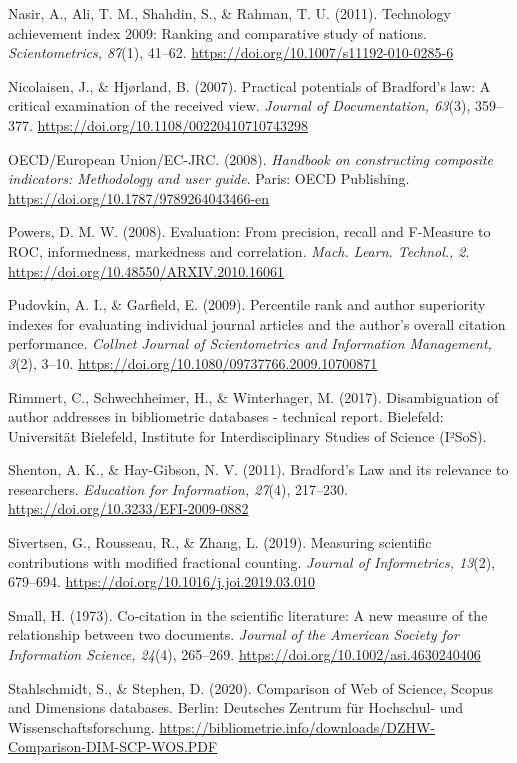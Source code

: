 \documentclass[
  letterpaper,
]{scrreprt}
\begin{document}
Nasir, A., Ali, T. M., Shahdin, S., \& Rahman, T. U. (2011). Technology
achievement index 2009: Ranking and comparative study of nations.
\emph{Scientometrics, 87}(1), 41--62.
\url{https://doi.org/10.1007/s11192-010-0285-6}

Nicolaisen, J., \& Hjørland, B. (2007). Practical potentials of
Bradford's law: A critical examination of the received view.
\emph{Journal of Documentation, 63}(3), 359--377.
\url{https://doi.org/10.1108/00220410710743298}

OECD/European Union/EC-JRC. (2008). \emph{Handbook on constructing
composite indicators: Methodology and user guide}. Paris: OECD
Publishing. \url{https://doi.org/10.1787/9789264043466-en}

Powers, D. M. W. (2008). Evaluation: From precision, recall and
F-Measure to ROC, informedness, markedness and correlation. \emph{Mach.
Learn. Technol., 2}. \url{https://doi.org/10.48550/ARXIV.2010.16061}

Pudovkin, A. I., \& Garfield, E. (2009). Percentile rank and author
superiority indexes for evaluating individual journal articles and the
author's overall citation performance. \emph{Collnet Journal of
Scientometrics and Information Management, 3}(2), 3--10.
\url{https://doi.org/10.1080/09737766.2009.10700871}

Rimmert, C., Schwechheimer, H., \& Winterhager, M. (2017).
Disambiguation of author addresses in bibliometric databases - technical
report. Bielefeld: Universität Bielefeld, Institute for
Interdisciplinary Studies of Science (I²SoS).

Shenton, A. K., \& Hay-Gibson, N. V. (2011). Bradford's Law and its
relevance to researchers. \emph{Education for Information, 27}(4),
217--230. \url{https://doi.org/10.3233/EFI-2009-0882}

Sivertsen, G., Rousseau, R., \& Zhang, L. (2019). Measuring scientific
contributions with modified fractional counting. \emph{Journal of
Informetrics, 13}(2), 679--694.
\url{https://doi.org/10.1016/j.joi.2019.03.010}

Small, H. (1973). Co‐citation in the scientific literature: A new
measure of the relationship between two documents. \emph{Journal of the
American Society for Information Science, 24}(4), 265--269.
\url{https://doi.org/10.1002/asi.4630240406}

Stahlschmidt, S., \& Stephen, D. (2020). Comparison of Web of Science,
Scopus and Dimensions databases. Berlin: Deutsches Zentrum für
Hochschul- und Wissenschaftsforschung.
\url{https://bibliometrie.info/downloads/DZHW-Comparison-DIM-SCP-WOS.PDF}
\end{document}
